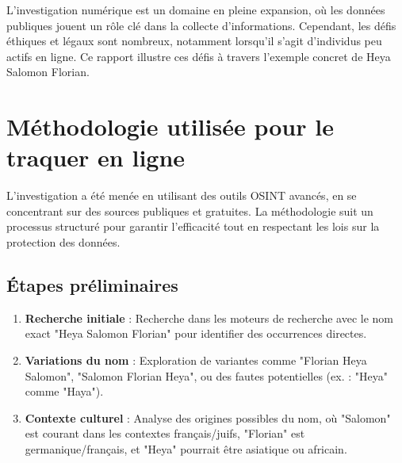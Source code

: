 \documentclass[12pt,a4paper]{article}
\begin{document}
L'investigation numérique est un domaine en pleine expansion, où les données publiques jouent un rôle clé dans la collecte d'informations. Cependant, les défis éthiques et légaux sont nombreux, notamment lorsqu'il s'agit d'individus peu actifs en ligne. Ce rapport illustre ces défis à travers l'exemple concret de Heya Salomon Florian.

\section{Méthodologie utilisée pour le traquer en ligne}
L'investigation a été menée en utilisant des outils OSINT avancés, en se concentrant sur des sources publiques et gratuites. La méthodologie suit un processus structuré pour garantir l'efficacité tout en respectant les lois sur la protection des données.

\subsection{Étapes préliminaires}
\begin{enumerate}
    \item \textbf{Recherche initiale} : Recherche dans les moteurs de recherche avec le nom exact "Heya Salomon Florian" pour identifier des occurrences directes.
    \item \textbf{Variations du nom} : Exploration de variantes comme "Florian Heya Salomon", "Salomon Florian Heya", ou des fautes potentielles (ex. : "Heya" comme "Haya").
    \item \textbf{Contexte culturel} : Analyse des origines possibles du nom, où "Salomon" est courant dans les contextes français/juifs, "Florian" est germanique/français, et "Heya" pourrait être asiatique ou africain.
\end{enumerate}
\end{document}
